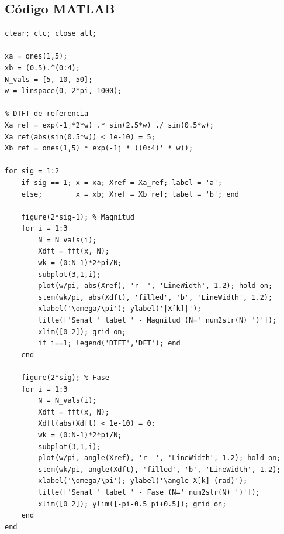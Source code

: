 \documentclass[../Main_Include.tex]{subfiles}
\begin{document}
\subsection*{Código MATLAB}

\begin{lstlisting}[style=matlab_dark,
    caption={Ejercicio 5 --- DFT con zero-padding vs.\ DTFT},
    label={lst:ej5}]
% ETN1015 - Ejercicio 5: DFT con zero-padding vs DTFT
clear; clc; close all;

xa = ones(1,5);
xb = (0.5).^(0:4);
N_vals = [5, 10, 50];
w = linspace(0, 2*pi, 1000);

% DTFT de referencia
Xa_ref = exp(-1j*2*w) .* sin(2.5*w) ./ sin(0.5*w);
Xa_ref(abs(sin(0.5*w)) < 1e-10) = 5;
Xb_ref = ones(1,5) * exp(-1j * ((0:4)' * w));

for sig = 1:2
    if sig == 1; x = xa; Xref = Xa_ref; label = 'a';
    else;        x = xb; Xref = Xb_ref; label = 'b'; end

    figure(2*sig-1); % Magnitud
    for i = 1:3
        N = N_vals(i);
        Xdft = fft(x, N);
        wk = (0:N-1)*2*pi/N;
        subplot(3,1,i);
        plot(w/pi, abs(Xref), 'r--', 'LineWidth', 1.2); hold on;
        stem(wk/pi, abs(Xdft), 'filled', 'b', 'LineWidth', 1.2);
        xlabel('\omega/\pi'); ylabel('|X[k]|');
        title(['Senal ' label ' - Magnitud (N=' num2str(N) ')']);
        xlim([0 2]); grid on;
        if i==1; legend('DTFT','DFT'); end
    end

    figure(2*sig); % Fase
    for i = 1:3
        N = N_vals(i);
        Xdft = fft(x, N);
        Xdft(abs(Xdft) < 1e-10) = 0;
        wk = (0:N-1)*2*pi/N;
        subplot(3,1,i);
        plot(w/pi, angle(Xref), 'r--', 'LineWidth', 1.2); hold on;
        stem(wk/pi, angle(Xdft), 'filled', 'b', 'LineWidth', 1.2);
        xlabel('\omega/\pi'); ylabel('\angle X[k] (rad)');
        title(['Senal ' label ' - Fase (N=' num2str(N) ')']);
        xlim([0 2]); ylim([-pi-0.5 pi+0.5]); grid on;
    end
end
\end{lstlisting}
\end{document}
